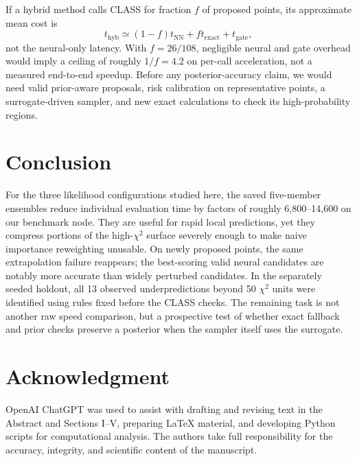 \documentclass[a4paper,conference,10pt]{IEEEtran}
\begin{document}
If a hybrid method calls CLASS for fraction $f$ of proposed points, its approximate mean cost is
\begin{equation}
 t_{\mathrm{hyb}}\simeq (1-f)t_{\mathrm{NN}}+ft_{\mathrm{exact}}+t_{\mathrm{gate}},\label{eq:cost}
\end{equation}
not the neural-only latency. With $f=26/108$, negligible neural and gate overhead would imply a ceiling of roughly $1/f=4.2$ on per-call acceleration, not a measured end-to-end speedup. Before any posterior-accuracy claim, we would need valid prior-aware proposals, risk calibration on representative points, a surrogate-driven sampler, and new exact calculations to check its high-probability regions.

\section{Conclusion}
For the three likelihood configurations studied here, the saved five-member ensembles reduce individual evaluation time by factors of roughly 6,800--14,600 on our benchmark node. They are useful for rapid local predictions, yet they compress portions of the high-$\chi^2$ surface severely enough to make naive importance reweighting unusable. On newly proposed points, the same extrapolation failure reappears; the best-scoring valid neural candidates are notably more accurate than widely perturbed candidates. In the separately seeded holdout, all 13 observed underpredictions beyond 50 $\chi^2$ units were identified using rules fixed before the CLASS checks. The remaining task is not another raw speed comparison, but a prospective test of whether exact fallback and prior checks preserve a posterior when the sampler itself uses the surrogate.

\section*{Acknowledgment}

OpenAI ChatGPT was used to assist with drafting and
revising text in the Abstract and Sections I--V,
preparing LaTeX material, and developing Python
scripts for computational analysis. The authors
take full responsibility for the accuracy, integrity,
and scientific content of the manuscript.
\end{document}
